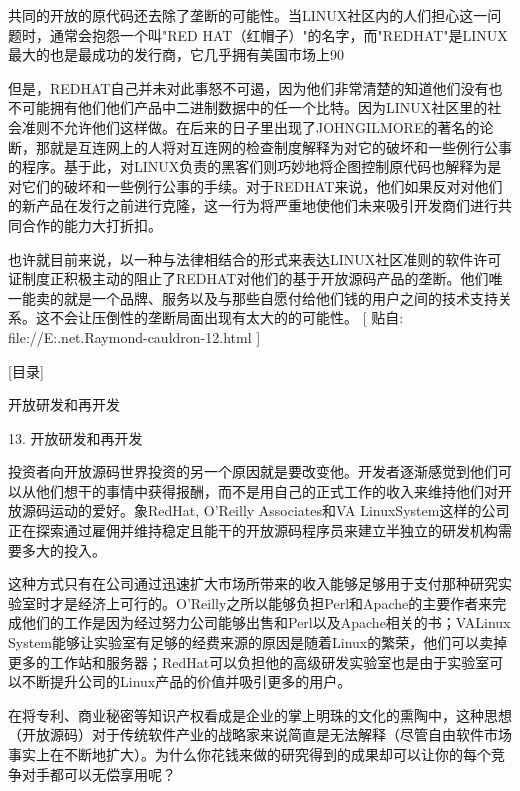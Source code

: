 \documentclass[a4paper,12pt,UTF8,twoside]{ctexbook}
\begin{document}
共同的开放的原代码还去除了垄断的可能性。当LINUX社区内的人们担心这一问题时，通常会抱怨一个叫"RED HAT（红帽子）"的名字，而"REDHAT"是LINUX最大的也是最成功的发行商，它几乎拥有美国市场上90%


但是，REDHAT自己并未对此事怒不可遏，因为他们非常清楚的知道他们没有也不可能拥有他们他们产品中二进制数据中的任一个比特。因为LINUX社区里的社会准则不允许他们这样做。在后来的日子里出现了JOHNGILMORE的著名的论断，那就是互连网上的人将对互连网的检查制度解释为对它的破坏和一些例行公事的程序。基于此，对LINUX负责的黑客们则巧妙地将企图控制原代码也解释为是对它们的破坏和一些例行公事的手续。对于REDHAT来说，他们如果反对对他们的新产品在发行之前进行克隆，这一行为将严重地使他们未来吸引开发商们进行共同合作的能力大打折扣。


也许就目前来说，以一种与法律相结合的形式来表达LINUX社区准则的软件许可证制度正积极主动的阻止了REDHAT对他们的基于开放源码产品的垄断。他们唯一能卖的就是一个品牌、服务以及与那些自愿付给他们钱的用户之间的技术支持关系。这不会让压倒性的垄断局面出现有太大的的可能性。
[ 贴自: file://E:\joyfire\joyfire.net\bible\Eric.Raymond\magic-cauldron-12.html ]

[目录]

开放研发和再开发

13. 开放研发和再开发

投资者向开放源码世界投资的另一个原因就是要改变他。开发者逐渐感觉到他们可以从他们想干的事情中获得报酬，而不是用自己的正式工作的收入来维持他们对开放源码运动的爱好。象RedHat, O'Reilly Associates和VA LinuxSystem这样的公司正在探索通过雇佣并维持稳定且能干的开放源码程序员来建立半独立的研发机构需要多大的投入。


这种方式只有在公司通过迅速扩大市场所带来的收入能够足够用于支付那种研究实验室时才是经济上可行的。O'Reilly之所以能够负担Perl和Apache的主要作者来完成他们的工作是因为经过努力公司能够出售和Perl以及Apache相关的书；VALinux System能够让实验室有足够的经费来源的原因是随着Linux的繁荣，他们可以卖掉更多的工作站和服务器；RedHat可以负担他的高级研发实验室也是由于实验室可以不断提升公司的Linux产品的价值并吸引更多的用户。


在将专利、商业秘密等知识产权看成是企业的掌上明珠的文化的熏陶中，这种思想（开放源码）对于传统软件产业的战略家来说简直是无法解释（尽管自由软件市场事实上在不断地扩大）。为什么你花钱来做的研究得到的成果却可以让你的每个竞争对手都可以无偿享用呢？
\end{document}
